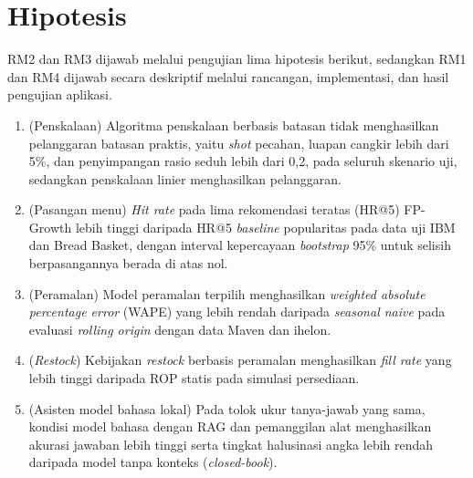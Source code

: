 \section{Hipotesis}
\label{sec:hipotesis}

RM2 dan RM3 dijawab melalui pengujian lima hipotesis berikut, sedangkan RM1 dan RM4 dijawab secara deskriptif melalui rancangan, implementasi, dan hasil pengujian aplikasi.

\begin{enumerate}[label=\textbf{H\arabic*}, leftmargin=*, labelsep=1em]
\item (Penskalaan) Algoritma penskalaan berbasis batasan tidak menghasilkan pelanggaran batasan praktis, yaitu \textit{shot} pecahan, luapan cangkir lebih dari 5\%, dan penyimpangan rasio seduh lebih dari 0,2, pada seluruh skenario uji, sedangkan penskalaan linier menghasilkan pelanggaran.
\item (Pasangan menu) \textit{Hit rate} pada lima rekomendasi teratas (HR@5) FP-Growth lebih tinggi daripada HR@5 \textit{baseline} popularitas pada data uji IBM dan Bread Basket, dengan interval kepercayaan \textit{bootstrap} 95\% untuk selisih berpasangannya berada di atas nol.
\item (Peramalan) Model peramalan terpilih menghasilkan \textit{weighted absolute percentage error} (WAPE) yang lebih rendah daripada \textit{seasonal naive} pada evaluasi \textit{rolling origin} dengan data Maven dan ihelon.
\item (\textit{Restock}) Kebijakan \textit{restock} berbasis peramalan menghasilkan \textit{fill rate} yang lebih tinggi daripada ROP statis pada simulasi persediaan.
\item (Asisten model bahasa lokal) Pada tolok ukur tanya-jawab yang sama, kondisi model bahasa dengan RAG dan pemanggilan alat menghasilkan akurasi jawaban lebih tinggi serta tingkat halusinasi angka lebih rendah daripada model tanpa konteks (\textit{closed-book}).
\end{enumerate}

